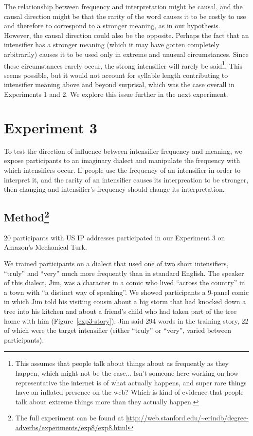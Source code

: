 \documentclass[10pt,letterpaper]{article}
\begin{document}
The relationship between frequency and interpretation might be causal, and the causal direction might be that the rarity of the word causes it to be costly to use and therefore to correspond to a stronger meaning, as in our hypothesis.
However, the causal direction could also be the opposite.
Perhaps the fact that an intensifier has a stronger meaning (which it may have gotten completely arbitrarily) causes it to be used only in extreme and unusual circumstances.
Since these circumstances rarely occur, the strong intensifier will rarely be said\footnote{This assumes that people talk about things about as frequently as they happen, which might not be the case... Isn't someone here working on how representative the internet is of what actually happens, and super rare things have an inflated presence on the web? Which is kind of evidence that people talk about extreme things more than they actually happen.}.
This seems possible, but it would not account for syllable length contributing to intensifier meaning above and beyond surprisal,  which was the case overall in Experiments 1 and 2. 
We explore this issue further in the next experiment.

\section{Experiment 3}

To test the direction of influence between intensifier frequency and meaning, we expose participants to an imaginary dialect and manipulate the frequency with which intensifiers occur.
If people use the frequency of an intensifier in order to interpret it, and the rarity of an intensifier causes its interpreation to be stronger, then changing and intensifier's frequency should change its interpretation. 

\subsection{Method\footnote{The full experiment can be found at \url{http://web.stanford.edu/~erindb/degree-adverbs/experiments/exp8/exp8.html}}}


20 participants with US IP addresses participated in our Experiment 3 on Amazon's Mechanical Turk.

We trained participants on a dialect that used one of two short intensifiers, ``truly'' and ``very'' much more frequently than in standard English.
The speaker of this dialect, Jim, was a character in a comic who lived ``across the country'' in a town with ``a distinct way of speaking''.
We showed participants a 9-panel comic in which Jim told his visiting cousin about a big storm that had knocked down a tree into his kitchen and about a friend's child who had taken part of the tree home with him (Figure~\ref{exp3-story}).
Jim said 294 words in the training story, 22 of which were the target intensifier (either ``truly'' or ``very'', varied between participants).
\end{document}
